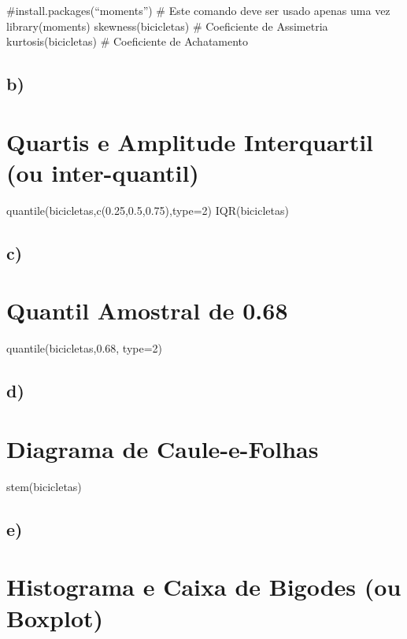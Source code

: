 \documentclass[
]{article}
\begin{document}
\#install.packages(``moments'') \# Este comando deve ser usado apenas
uma vez library(moments) skewness(bicicletas) \# Coeficiente de
Assimetria kurtosis(bicicletas) \# Coeficiente de Achatamento

\hypertarget{b}{%
\subsection{b)}\label{b}}

\hypertarget{quartis-e-amplitude-interquartil-ou-inter-quantil}{%
\section{Quartis e Amplitude Interquartil (ou
inter-quantil)}\label{quartis-e-amplitude-interquartil-ou-inter-quantil}}

quantile(bicicletas,c(0.25,0.5,0.75),type=2) IQR(bicicletas)

\hypertarget{c}{%
\subsection{c)}\label{c}}

\hypertarget{quantil-amostral-de-0.68}{%
\section{Quantil Amostral de 0.68}\label{quantil-amostral-de-0.68}}

quantile(bicicletas,0.68, type=2)

\hypertarget{d}{%
\subsection{d)}\label{d}}

\hypertarget{diagrama-de-caule-e-folhas}{%
\section{Diagrama de Caule-e-Folhas}\label{diagrama-de-caule-e-folhas}}

stem(bicicletas)

\hypertarget{e}{%
\subsection{e)}\label{e}}

\hypertarget{histograma-e-caixa-de-bigodes-ou-boxplot}{%
\section{Histograma e Caixa de Bigodes (ou
Boxplot)}\label{histograma-e-caixa-de-bigodes-ou-boxplot}}
\end{document}
